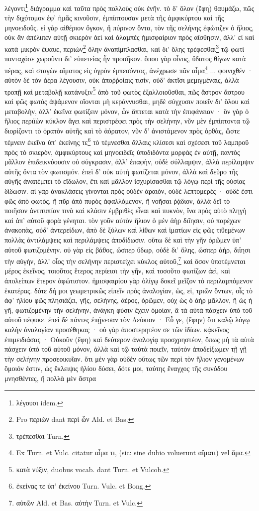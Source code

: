 \documentclass[a4paper, 11pt, oneside, polutonikogreek, german]{article}
\begin{document}
λέγοντι\footnote{λέγουσι idem.} διάγραμμα καὶ ταῦτα πρὸς πολλοὺς οὐκ ἐνῆν. τὸ δ' ὅλον (ἔφη) θαυμάζω, πῶς τὴν διχότομον ἐφ' ἡμᾶς κινοῦσιν, ἐμπίπτουσαν μετὰ τῆς ἀμφικύρτου καὶ τῆς μηνοειδοῦς. εἰ γὰρ αἰθέριον ὄγκον, ἢ πύρινον ὄντα, τὸν τῆς σελήνης ἐφώτιζεν ὁ ἥλιος, οὐκ ἂν ἀπέλιπεν αὐτῇ σκιερὸν ἀεὶ καὶ ἀλαμπὲς ἡμισφαίριον πρὸς αἴσθησιν, ἀλλ' εἰ καὶ κατὰ μικρὸν ἔψαυε, περιὼν\footnote{Pro περιὼν dant περὶ ὧν Ald. et Bas.} ὅλην ἀναπίμπλασθαι, καὶ δι' ὅλης τρέφεσθαι\footnote{τρέπεσθαι Turn.} τῷ φωτὶ πανταχόσε χωροῦντι δι' εὐπετείας ἦν προσῆκον. ὅπου γὰρ οἶνος, ὕδατος θίγων κατὰ πέρας, καὶ σταγὼν αἵματος εἰς ὑγρὸν ἐμπεσόντος, ἀνέχρωσε πᾶν αἷμα\footnote{Ex Turn. et Vulc. citatur αἷμα τι, (sic: sine dubio voluerunt αἵματι) vel ἅμα.} ... φοινιχθέν · αὐτὸν δὲ τὸν ἀέρα λέγουσιν, οὐκ ἀποῤῥοίαις τισὶν, οὐδ' ἀκτῖσι μεμιγμέναις, ἀλλὰ τροπῇ καὶ μεταβολῇ κατάνυξιν\footnote{κατὰ νύξιν, duobus vocab. dant Turn. et Vulcob.} ἀπὸ τοῦ φωτὸς ἐξαλλοιοῦσθαι, πῶς ἄστρον ἄστρου καὶ φῶς φωτὸς ἁψάμενον οἴονται μὴ κεράννυσθαι, μηδὲ σύγχυσιν ποιεῖν δι' ὅλου καὶ μεταβολὴν, ἀλλ' ἐκεῖνα φωτίζειν μόνον, ὧν ἅπτεται κατὰ τὴν ἐπιφάνειαν · ὃν γὰρ ὁ ἥλιος περιϊὼν κύκλον ἄγει καὶ περιστρέφει πρὸς τὴν σελήνην, νῦν μὲν ἐμπίπτοντα τῷ διορίζοντι τὸ ὁρατὸν αὐτῆς καὶ τὸ ἀόρατον, νῦν δ' ἀνιστάμενον πρὸς ὀρθὰς, ὥστε τέμνειν ἐκεῖνα ὑπ' ἐκείνης τε\footnote{ἐκείνας τε ὑπ' ἐκείνου Turn. Vulc. et Bong.} τὸ τέμνεσθαι ἄλλαις κλίσεσι καὶ σχέσεσι τοῦ λαμπροῦ πρὸς τὸ σκιερὸν, ἀμφικύρτους καὶ μηνοειδεῖς ὑποδιδόντα μορφὰς ἐν αὐτῇ, παντὸς μᾶλλον ἐπιδεικνύουσιν οὐ σύγκρασιν, ἀλλ' ἐπαφὴν, οὐδὲ σύλλαμψιν, ἀλλὰ περίλαμψιν αὐτῆς ὄντα τὸν φωτισμόν. ἐπεὶ δ' οὐκ αὐτὴ φωτίζεται μόνον, ἀλλὰ καὶ δεῦρο τῆς αὐγῆς ἀναπέμπει τὸ εἴδωλον, ἔτι καὶ μᾶλλον ἰσχυρίσασθαι τῷ λόγῳ περὶ τῆς οὐσίας δίδωσιν. αἱ γὰρ ἀνακλάσεις γίνονται πρὸς οὐδὲν ἀραιὸν, οὐδὲ λεπτομερές · οὐδέ ἐστι φῶς ἀπὸ φωτὸς, ἢ πῦρ ἀπὸ πυρὸς ἀφαλλόμενον, ἢ νοῆσαι ῥᾴδιον, ἀλλὰ δεῖ τὸ ποιῆσον ἀντιτυπίαν τινὰ καὶ κλάσιν ἐμβριθὲς εἶναι καὶ πυκνὸν, ἵνα πρὸς αὐτὸ πληγὴ καὶ ἀπ' αὐτοῦ φορὰ γένηται. τὸν γοῦν αὐτὸν ἥλιον ὁ μὲν ἀὴρ διΐησιν, οὐ παρέχων ἀνακοπὰς, οὐδ' ἀντερείδων, ἀπὸ δὲ ξύλων καὶ λίθων καὶ ἱματίων εἰς φῶς τιθεμένων πολλὰς ἀντιλάμψεις καὶ περιλάμψεις ἀποδίδωσιν. οὕτω δὲ καὶ τὴν γῆν ὁρῶμεν ὑπ' αὐτοῦ φωτιζομένην. οὐ γὰρ εἰς βάθος, ὥσπερ ὕδωρ, οὐδὲ δι' ὅλης, ὥσπερ ἀὴρ, διΐησι τὴν αὐγὴν, ἀλλ' οἷος τὴν σελήνην περιστείχει κύκλος αὐτοῦ,\footnote{αὐτῶν Ald. et Bas. αὐτὴν Turn. et Vulc.} καὶ ὅσον ὑποτέμνεται μέρος ἐκεῖνος, τοιοῦτος ἕτερος περίεισι τὴν γῆν, καὶ τοσοῦτο φωτίζων ἀεὶ, καὶ ἀπολείπων ἕτερον ἀφώτιστον. ἡμισφαιρίου γὰρ ὀλίγῳ δοκεῖ μεῖζον τὸ περιλαμπόμενον ἑκατέρας. δότε δή μοι γεωμετρικῶς εἰπεῖν πρὸς ἀναλογίαν, ὡς, εἰ, τριῶν ὄντων, οἷς τὸ ἀφ' ἡλίου φῶς πλησιάζει, γῆς, σελήνης, ἀέρος, ὁρῶμεν, οὐχ ὡς ὁ ἀὴρ μᾶλλον, ἢ ὡς ἡ γῆ, φωτιζομένην τὴν σελήνην, ἀνάγκη φύσιν ἔχειν ὁμοίαν, ἃ τὰ αὐτὰ πάσχειν ὑπὸ τοῦ αὐτοῦ πέφυκε. ἐπεὶ δὲ πάντες ἐπῄνεσαν τὸν Λεύκιον · Εὖ γε, (ἔφην) ὅτι καλῷ λόγῳ καλὴν ἀναλογίαν προσέθηκας · οὐ γὰρ ἀποστερητέον σε τῶν ἰδίων. κᾀκεῖνος ἐπιμειδιάσας · Οὐκοῦν (ἔφη) καὶ δεύτερον ἀναλογίᾳ προσχρηστέον, ὅπως μὴ τὰ αὐτὰ πάσχειν ὑπὸ τοῦ αὐτοῦ μόνον, ἀλλὰ καὶ τῷ ταὐτὰ ποιεῖν, ταὐτὸν ἀποδείξωμεν τῇ γῇ τὴν σελήνην προσεοικυῖαν. ὅτι μὲν γὰρ οὐδὲν οὕτως τῶν περὶ τὸν ἥλιον γενομένων ὅμοιόν ἐστιν, ὡς ἔκλειψις ἡλίου δύσει, δότε μοι, ταύτης ἔναγχος τῆς συνόδου μνησθέντες, ἢ πολλὰ μὲν ἄστρα 
\end{document}
